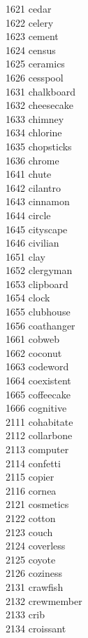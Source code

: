 1621 cedar \\
1622 celery \\
1623 cement \\
1624 census \\
1625 ceramics \\
1626 cesspool \\
1631 chalkboard \\
1632 cheesecake \\
1633 chimney \\
1634 chlorine \\
1635 chopsticks \\
1636 chrome \\
1641 chute \\
1642 cilantro \\
1643 cinnamon \\
1644 circle \\
1645 cityscape \\
1646 civilian \\
1651 clay \\
1652 clergyman \\
1653 clipboard \\
1654 clock \\
1655 clubhouse \\
1656 coathanger \\
1661 cobweb \\
1662 coconut \\
1663 codeword \\
1664 coexistent \\
1665 coffeecake \\
1666 cognitive \\
2111 cohabitate \\
2112 collarbone \\
2113 computer \\
2114 confetti \\
2115 copier \\
2116 cornea \\
2121 cosmetics \\
2122 cotton \\
2123 couch \\
2124 coverless \\
2125 coyote \\
2126 coziness \\
2131 crawfish \\
2132 crewmember \\
2133 crib \\
2134 croissant \\
